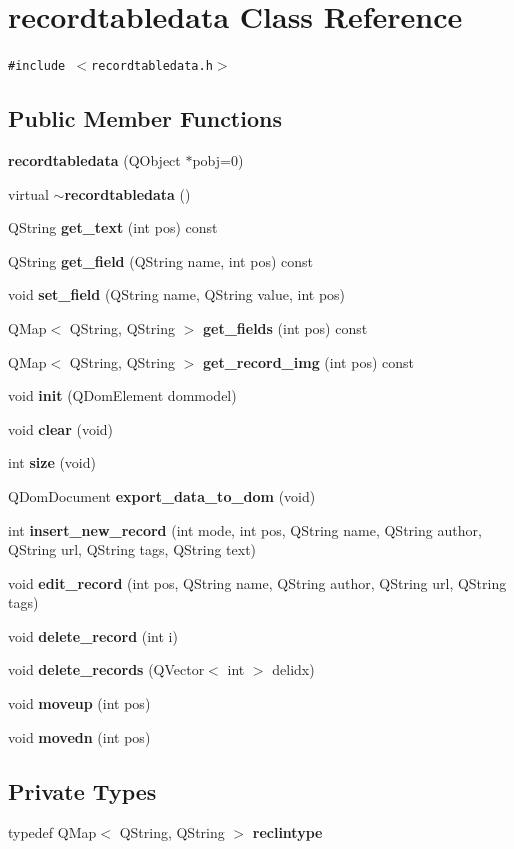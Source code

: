 \section{recordtabledata Class Reference}
\label{classrecordtabledata}
{\tt \#include $<$recordtabledata.h$>$}

\subsection*{Public Member Functions}
\begin{CompactItemize}
\item 
{\bf recordtabledata} (QObject $\ast$pobj=0)
\item 
virtual {\bf $\sim$recordtabledata} ()
\item 
QString {\bf get\_\-text} (int pos) const
\item 
QString {\bf get\_\-field} (QString name, int pos) const
\item 
void {\bf set\_\-field} (QString name, QString value, int pos)
\item 
QMap$<$ QString, QString $>$ {\bf get\_\-fields} (int pos) const
\item 
QMap$<$ QString, QString $>$ {\bf get\_\-record\_\-img} (int pos) const
\item 
void {\bf init} (QDom\-Element dommodel)
\item 
void {\bf clear} (void)
\item 
int {\bf size} (void)
\item 
QDom\-Document {\bf export\_\-data\_\-to\_\-dom} (void)
\item 
int {\bf insert\_\-new\_\-record} (int mode, int pos, QString name, QString author, QString url, QString tags, QString text)
\item 
void {\bf edit\_\-record} (int pos, QString name, QString author, QString url, QString tags)
\item 
void {\bf delete\_\-record} (int i)
\item 
void {\bf delete\_\-records} (QVector$<$ int $>$ delidx)
\item 
void {\bf moveup} (int pos)
\item 
void {\bf movedn} (int pos)
\end{CompactItemize}
\subsection*{Private Types}
\begin{CompactItemize}
\item 
typedef QMap$<$ QString, QString $>$ {\bf reclintype}
\end{CompactItemize}
